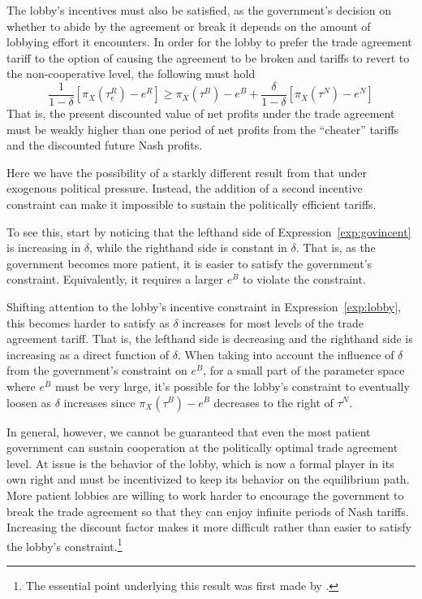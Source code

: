 \documentclass[12pt,titlepage]{article}
\newcommand{\de}{\delta}
\begin{document}
The lobby's incentives must also be satisfied, as the government's decision on whether to abide by the agreement or break it depends on the amount of lobbying effort it encounters. In order for the lobby to prefer the trade agreement tariff to the option of causing the agreement to be broken and tariffs to revert to the non-cooperative level, the following must hold
\begin{equation}
  \frac{1}{1-\de}\left[\pi_X(\tau_e^R) - e^R\right] \geq \pi_X(\tau^B) - e^B + \frac{\de}{1-\de}\left[\pi_X(\tau^N) - e^N\right]
	\label{exp:lobby}
\end{equation}
That is, the present discounted value of net profits under the trade agreement must be weakly higher than one period of net profits from the ``cheater'' tariffs and the discounted future Nash profits.

Here we have the possibility of a starkly different result from that under exogenous political pressure. Instead, the addition of a second incentive constraint can make it impossible to sustain the politically efficient tariffs.

To see this, start by noticing that the lefthand side of Expression~\ref{exp:govincent} is increasing in $\de$, while the righthand side is constant in $\de$. That is, as the government becomes more patient, it is easier to satisfy the government's constraint. Equivalently, it requires a larger $e^B$ to violate the constraint.

Shifting attention to the lobby's incentive constraint in Expression~\ref{exp:lobby}, this becomes harder to satisfy as $\de$ increases for most levels of the trade agreement tariff. That is, the lefthand side is decreasing and the righthand side is increasing as a direct function of $\de$. When taking into account the influence of $\de$ from the government's constraint on $e^B$, for a small part of the parameter space where $e^B$ must be very large, it's possible for the lobby's constraint to eventually loosen as $\de$ increases since $\pi_X(\tau^B) - e^B$ decreases to the right of $\tau^N$.

In general, however, we cannot be guaranteed that even the most patient government can sustain cooperation at the politically optimal trade agreement level. At issue is the behavior of the lobby, which is now a formal player in its own right and must be incentivized to keep its behavior on the equilibrium path. More patient lobbies are willing to work harder to encourage the government to break the trade agreement so that they can enjoy infinite periods of Nash tariffs. Increasing the discount factor makes it more difficult rather than easier to satisfy the lobby's constraint.\footnote{The essential point underlying this result was first made by \Textcite{buzard2013a}.}
\end{document}
